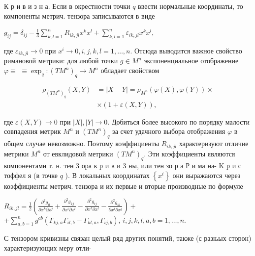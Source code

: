 \documentclass[10pt]{article}
\begin{document}
К р и в и з н а. Если в окрестности точки $q$ ввести нормальные координаты, то компоненты метрич. тензора записываются в виде



$g_{i j}=\delta_{i j}-\frac{1}{3} \sum_{k, l=1}^{n} R_{i k, j l} x^{k} x^{l}+\sum_{k, l=1}^{n} \varepsilon_{i k, j l} x^{k} x^{l}$,



где $\varepsilon_{i k, j l} \rightarrow 0$ при $x^{i} \rightarrow 0, i, j, k, l=1, \ldots, n$. Отсюда выводится важное свойство римановой метрики: для любой точки $g \in M^{n}$ экспоненциальное отображение $\varphi \equiv$ $\equiv \exp _{q}:\left(T M^{n}\right)_{q} \rightarrow M^{n}$ обладает свойством



\[

\begin{aligned}

\rho_{\left(T M^{n}\right)_{q}}(X, Y) & =|X-Y|=\rho_{M^{n}}(\varphi(X), \varphi(Y)) \times \\

& \times(1+\varepsilon(X, Y)),

\end{aligned}

\]



где $\varepsilon(X, Y) \rightarrow 0$ при $|X|,|Y| \rightarrow 0$. Добиться более высокого по порядку малости совпадения метрик $M^{n}$ и $\left(T M^{n}\right)_{q}$ за счет удачного выбора отображения $\varphi$ в общем случае невозможно. Поэтому коэффициенты $R_{i k, j l}$ характеризуют отличие метрики $M^{n}$ от евклидовой метрики $\left(T M^{n}\right)_{q}$. Эти коэффициенты являются компонентами т. н. тен 3 ора к р и в и 3 ны, или тен зо р а Р и ма на- K р и с тоффел я (в точке $q$ ). В локальных координатах $\left\{x^{i}\right\}$ они выражаются через коэффициенты метрич. тензора и их первые и вторые производные по формуле



$R_{i k, j l}=\frac{1}{2}\left(\frac{\partial^{2} g_{i l}}{\partial x^{k} \partial x^{j}}+\frac{\partial^{2} g_{k j}}{\partial x^{i} \partial x^{l}}-\frac{\partial^{2} g_{i j}}{\partial x^{k} \partial x^{l}}-\frac{\partial^{2} g_{k l}}{\partial x^{i} \partial x^{j}}\right)+$ $+\sum_{a, b=1}^{n} g^{a b}\left(\Gamma_{k j, a} \Gamma_{i l, b}-\Gamma_{k l, a}, \Gamma_{i j, b}\right)$, $i, j, k, l, a, b=1, \ldots, n$.



С тензором кривизны связан целый ряд других понятий, также (с разњых сторон) характеризующих меру отли-
\end{document}
